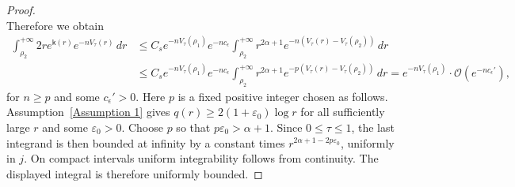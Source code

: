 \documentclass[a4paper]{article}
\numberwithin{equation}{section}
\begin{document}
\begin{proof}
\begin{equation}
\end{equation}
Therefore we obtain
\begin{align*}
    \int_{\rho_2}^{+\infty}2re^{\mathsf{k}(r)}e^{-nV_{\tau}(r)}\,dr
    &\leq 
    C_s e^{-nV_{\tau}(\rho_1)}
    e^{-nc_\epsilon}\int_{\rho_2}^{+\infty}r^{2\alpha+1}e^{-n(V_{\tau}(r)-V_{\tau}(\rho_2))}\,dr
    \\
    &\leq 
   C_s e^{-nV_{\tau}(\rho_1)}e^{-nc_{\epsilon}}
    \int_{\rho_2}^{+\infty}r^{2\alpha+1}e^{-p(V_{\tau}(r)-V_{\tau}(\rho_2))}\,dr
    =e^{-nV_{\tau}(\rho_1)}\cdot \mathcal{O}(e^{-nc_{\epsilon}'}),
\end{align*}
for $n\geq p$ and some $c_\epsilon'>0$.  Here $p$ is a fixed positive
integer chosen as follows.  Assumption~\ref{Assumption 1} gives
$q(r)\geq2(1+\varepsilon_0)\log r$ for all sufficiently large $r$ and
some $\varepsilon_0>0$.  Choose $p$ so that $p\varepsilon_0>\alpha+1$.
Since $0\leq\tau\leq1$, the last integrand is then bounded at infinity
by a constant times $r^{2\alpha+1-2p\varepsilon_0}$, uniformly in $j$.
On compact intervals uniform integrability follows from continuity.
The displayed integral is therefore uniformly bounded.


\end{proof}
\end{document}

